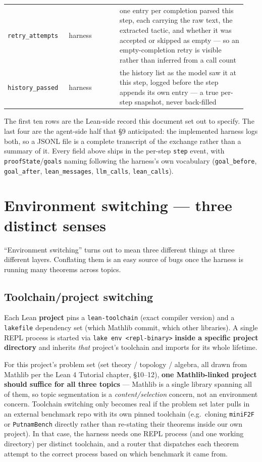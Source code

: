 \begin{center}
\begin{tabular}{@{}p{0.24\linewidth}p{0.20\linewidth}p{0.50\linewidth}@{}}
\texttt{retry\_attempts} & harness & one entry per completion parsed this step, each carrying the raw text, the extracted tactic, and whether it was accepted or skipped as empty --- so an empty-completion retry is visible rather than inferred from a call count \\
\texttt{history\_passed} & harness & the history list as the model saw it at this step, logged before the step appends its own entry --- a true per-step snapshot, never back-filled \\
\hline
\end{tabular}
\end{center}

The first ten rows are the Lean-side record this document set out to specify.
The last four are the agent-side half that \S9 anticipated: the implemented
harness logs both, so a JSONL file is a complete transcript of the exchange
rather than a summary of it. Every field above ships in the per-step
\texttt{step} event, with \texttt{proofState}/\texttt{goals} naming following
the harness's own vocabulary (\texttt{goal\_before}, \texttt{goal\_after},
\texttt{lean\_messages}, \texttt{llm\_calls}, \texttt{lean\_calls}).

\section{Environment switching --- three distinct senses}

``Environment switching'' turns out to mean three different things at three different layers. Conflating them is an easy source of bugs once the harness is running many theorems across topics.

\subsection{Toolchain/project switching}

Each Lean \textbf{project} pins a \texttt{lean-toolchain} (exact compiler version) and a \texttt{lakefile} dependency set (which Mathlib commit, which other libraries). A single REPL process is started via \texttt{lake env <repl-binary>} \textbf{inside a specific project directory} and inherits \emph{that} project's toolchain and imports for its whole lifetime.

For this project's problem set (set theory / topology / algebra, all drawn from Mathlib per the Lean 4 Tutorial chapter, \S10--12), \textbf{one Mathlib-linked project should suffice for all three topics} --- Mathlib is a single library spanning all of them, so topic segmentation is a \emph{content/selection} concern, not an environment concern. Toolchain switching only becomes real if the problem set later pulls in an external benchmark repo with its own pinned toolchain (e.g.\ cloning \texttt{miniF2F} or \texttt{PutnamBench} directly rather than re-stating their theorems inside our own project). In that case, the harness needs one REPL process (and one working directory) per distinct toolchain, and a router that dispatches each theorem attempt to the correct process based on which benchmark it came from.

